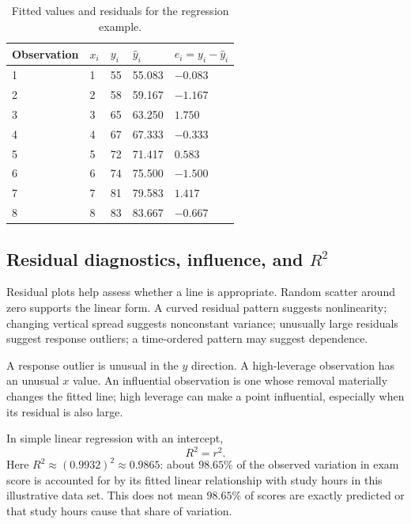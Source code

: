 \documentclass[11pt]{article}
\begin{document}
\begin{table}[ht]
\centering
\caption{Fitted values and residuals for the regression example.}\label{tab:residuals}
\begin{tabularx}{0.85\textwidth}{@{}lYYYY@{}}
\toprule
Observation & $x_i$ & $y_i$ & $\widehat y_i$ & $e_i=y_i-\widehat y_i$ \\
 & 1 & 55 & 55.083 & $-0.083$ \\
2 & 2 & 58 & 59.167 & $-1.167$ \\
3 & 3 & 65 & 63.250 & $1.750$ \\
4 & 4 & 67 & 67.333 & $-0.333$ \\
5 & 5 & 72 & 71.417 & $0.583$ \\
6 & 6 & 74 & 75.500 & $-1.500$ \\
7 & 7 & 81 & 79.583 & $1.417$ \\
8 & 8 & 83 & 83.667 & $-0.667$ \\
\bottomrule
\end{tabularx}
\end{table}

\subsection{Residual diagnostics, influence, and \texorpdfstring{$R^2$}{R2}}
Residual plots help assess whether a line is appropriate.  Random scatter
around zero supports the linear form.  A curved residual pattern suggests
nonlinearity; changing vertical spread suggests nonconstant variance;
unusually large residuals suggest response outliers; a time-ordered pattern
may suggest dependence.

A response outlier is unusual in the $y$ direction.  A high-leverage
observation has an unusual $x$ value.  An influential observation is one whose
removal materially changes the fitted line; high leverage can make a point
influential, especially when its residual is also large.

In simple linear regression with an intercept,
\begin{equation}\label{eq:r-squared}
R^2=r^2.
\end{equation}
Here $R^2\approx(0.9932)^2\approx0.9865$: about $98.65\%$ of the observed
variation in exam score is accounted for by its fitted linear relationship
with study hours in this illustrative data set.  This does not mean $98.65\%$
of scores are exactly predicted or that study hours cause that share of
variation.
\end{document}
